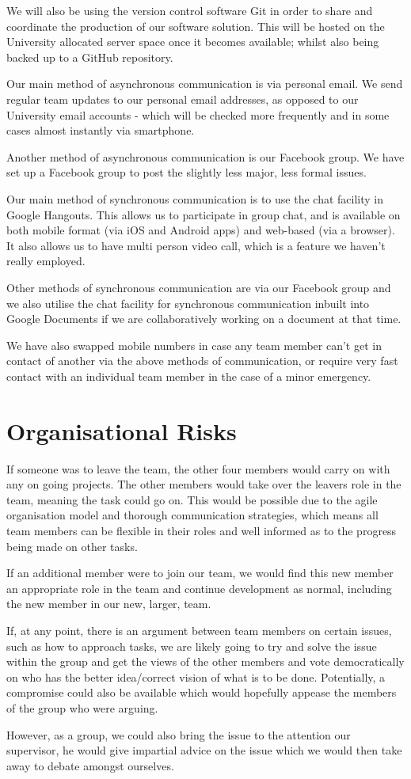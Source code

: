 \documentclass[preprint,12pt]{elsarticle}
\begin{document}
\noindent We will also be using the version control software Git in order to share and
coordinate the production of our software solution. This will be hosted on the
University allocated server space once it becomes available; whilst also being
backed up to a GitHub repository.

\noindent Our main method of asynchronous communication is via personal email. We send regular team updates to our personal email addresses, as opposed to our University email accounts - which will be checked more frequently and in some cases almost instantly via smartphone.

\noindent Another method of asynchronous communication is our Facebook group. We have set up a Facebook group to post the slightly less major, less formal issues.

\noindent Our main method of synchronous communication is to use the chat facility in Google Hangouts. This allows us to participate in group chat, and is available on both mobile format (via iOS and Android apps) and web-based (via a browser). It also allows us to have multi person video call, which is a feature we haven't really employed.

\noindent Other methods of synchronous communication are via our Facebook group and we also utilise the chat facility for synchronous communication inbuilt into Google Documents if we are collaboratively working on a document at that time.

\noindent We have also swapped mobile numbers in case any team member can't get in contact of another via the above methods of communication, or require very fast contact with an individual team member in the case of a minor emergency.

\section{Organisational Risks}
\noindent If someone was to leave the team, the other four members would carry on with
any on going projects. The other members would take over the leavers role in
the team, meaning the task could go on. This would be possible due to the agile
organisation model and thorough communication strategies, which means all team
members can be flexible in their roles and well informed as to the progress
being made on other tasks.

\noindent If an additional member were to join our team, we would find this new member an appropriate role in the team and continue development as normal, including the new member in our new, larger, team.

\noindent If, at any point, there is an argument between team members on certain issues,
such as how to approach tasks, we are likely going to try and solve the issue
within the group and get the views of the other members and vote democratically
on who has the better idea/correct vision of what is to be done. Potentially, a
compromise could also be available which would hopefully appease the members of
the group who were arguing.

\noindent However, as a group, we could also bring the issue to the attention our
supervisor, he would give impartial advice on the issue which we would then
take away to debate amongst ourselves.
\end{document}

